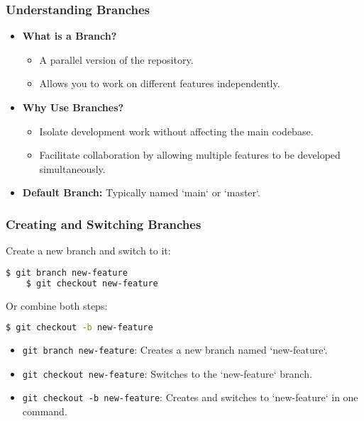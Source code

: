 
\begin{frame}
	\frametitle{Understanding Branches}
	\begin{itemize}
		\item \textbf{What is a Branch?}
		\begin{itemize}
			\item A parallel version of the repository.
			\item Allows you to work on different features independently.
		\end{itemize}
		\item \textbf{Why Use Branches?}
		\begin{itemize}
			\item Isolate development work without affecting the main codebase.
			\item Facilitate collaboration by allowing multiple features to be developed simultaneously.
		\end{itemize}
		\item \textbf{Default Branch:} Typically named `main` or `master`.
	\end{itemize}
\end{frame}

\begin{frame}[fragile]
	\frametitle{Creating and Switching Branches}
	Create a new branch and switch to it:
	\begin{lstlisting}[language=bash]
	$ git branch new-feature
	$ git checkout new-feature
	\end{lstlisting}
	Or combine both steps:
	\begin{lstlisting}[language=bash]
	$ git checkout -b new-feature
	\end{lstlisting}
	\begin{itemize}
		\item \texttt{git branch new-feature}: Creates a new branch named `new-feature`.
		\item \texttt{git checkout new-feature}: Switches to the `new-feature` branch.
		\item \texttt{git checkout -b new-feature}: Creates and switches to `new-feature` in one command.
	\end{itemize}
\end{frame}

